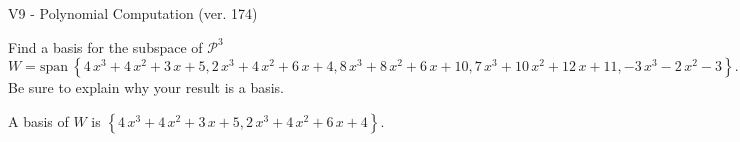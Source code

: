 \begin{exercise}
  \begin{exerciseTitle}V9 - Polynomial Computation (ver. 174)\end{exerciseTitle}
  \begin{exerciseStatement}
    Find a basis for the subspace of \(\mathcal{P}^3\) 
\[W=\mathrm{span}\ \left\{4 \, x^{3} + 4 \, x^{2} + 3 \, x + 5 , 2 \, x^{3} + 4 \, x^{2} + 6 \, x + 4 , 8 \, x^{3} + 8 \, x^{2} + 6 \, x + 10 , 7 \, x^{3} + 10 \, x^{2} + 12 \, x + 11 , -3 \, x^{3} - 2 \, x^{2} - 3\right\}.\]
 Be sure to explain why your result is a basis.


  \end{exerciseStatement}
  \begin{exerciseAnswer}
   A basis of \(W\) is  \(\left\{4 \, x^{3} + 4 \, x^{2} + 3 \, x + 5 , 2 \, x^{3} + 4 \, x^{2} + 6 \, x + 4\right\}\).
  


  \end{exerciseAnswer}
\end{exercise}
